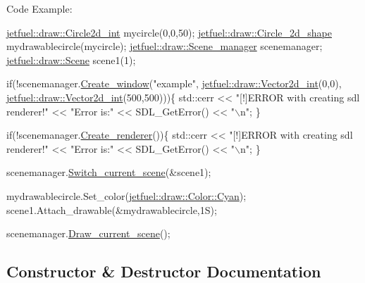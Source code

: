 Code Example\+: 
\begin{DoxyCode}
\hyperlink{classjetfuel_1_1draw_1_1Circle2d}{jetfuel::draw::Circle2d\_int} mycircle(0,0,50);
\hyperlink{classjetfuel_1_1draw_1_1Circle__2d__shape}{jetfuel::draw::Circle\_2d\_shape} mydrawablecircle(mycircle);
\hyperlink{classjetfuel_1_1draw_1_1Scene__manager}{jetfuel::draw::Scene\_manager} scenemanager;
\hyperlink{classjetfuel_1_1draw_1_1Scene}{jetfuel::draw::Scene} scene1(1);

\textcolor{keywordflow}{if}(!scenemanager.\hyperlink{classjetfuel_1_1draw_1_1Scene__manager_a5113e9062c272a22d383ba872417ba31}{Create\_window}(\textcolor{stringliteral}{"example"},
                         \hyperlink{classjetfuel_1_1draw_1_1Vector2d}{jetfuel::draw::Vector2d\_int}(0,0),
                         \hyperlink{classjetfuel_1_1draw_1_1Vector2d}{jetfuel::draw::Vector2d\_int}(500,500)))\{
   std::cerr << \textcolor{stringliteral}{"[!]ERROR with creating sdl renderer!"} <<
   \textcolor{stringliteral}{"Error is:"} << SDL\_GetError() << \textcolor{stringliteral}{"\(\backslash\)n"};
\}

  \textcolor{keywordflow}{if}(!scenemanager.\hyperlink{classjetfuel_1_1draw_1_1Scene__manager_afafecd926ce5e4b2543a6d583a7d24b6}{Create\_renderer}())\{
       std::cerr << \textcolor{stringliteral}{"[!]ERROR with creating sdl renderer!"} <<
      \textcolor{stringliteral}{"Error is:"} << SDL\_GetError() << \textcolor{stringliteral}{"\(\backslash\)n"};
  \}

scenemanager.\hyperlink{classjetfuel_1_1draw_1_1Scene__manager_a770c163b88ba8427539ee182315ea989}{Switch\_current\_scene}(&scene1);

mydrawablecircle.Set\_color(\hyperlink{classjetfuel_1_1draw_1_1Color_a9c9781b9377310494e8af2a5fe524ab4}{jetfuel::draw::Color::Cyan});
scene1.Attach\_drawable(&mydrawablecircle,1S);

scenemanager.\hyperlink{classjetfuel_1_1draw_1_1Scene__manager_a8af9a3abfd5121b1b8556342de435773}{Draw\_current\_scene}();
\end{DoxyCode}
 

\subsection{Constructor \& Destructor Documentation}
\mbox{\label{classjetfuel_1_1draw_1_1Circle__2d__shape_a0c6320cecb7ee7bfff185f4607a5f830}} 
